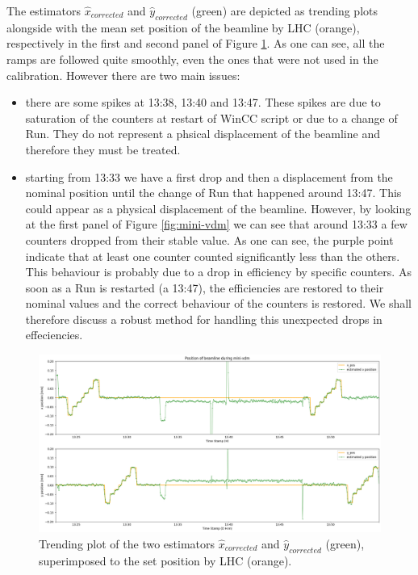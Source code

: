 The estimators $\hat{x}_{corrected}$ and $\hat{y}_{corrected}$ (green) are depicted as trending plots alongside with the mean set position of the beamline by LHC (orange), respectively in the first and second panel of Figure \ref{fig:traceplot_outliers}. As one can see, all the ramps are followed quite smoothly, even the ones that were not used in the calibration. However there are two main issues:
\begin{itemize}
    \item there are some spikes at 13:38, 13:40 and 13:47. These spikes are due to saturation of the counters at restart of WinCC script or due to a change of Run. They do not represent a phsical displacement of the beamline and therefore they must be treated.
    \item starting from 13:33 we have a first drop and then a displacement from the nominal position until the change of Run that happened around 13:47. This could appear as a physical displacement of the beamline. However, by looking at the first panel of Figure \ref{fig:mini-vdm} we can see that around 13:33 a few counters dropped from their stable value. As one can see, the purple point indicate that at least one counter counted significantly less than the others. This behaviour is probably due to a drop in efficiency by specific counters. As soon as a Run is restarted (a 13:47), the efficiencies are restored to their nominal values and the correct behaviour of the counters is restored. We shall therefore discuss a robust method for handling this unexpected drops in effeciencies.
\end{itemize}

\begin{figure}
    \centering
    \includegraphics[width=\textwidth]{figures/traceplot.png}
    \caption{Trending plot of the two estimators $\hat{x}_{corrected}$ and $\hat{y}_{corrected}$ (green), superimposed to the set position by LHC (orange).  }
    \label{fig:traceplot_outliers}
\end{figure}


